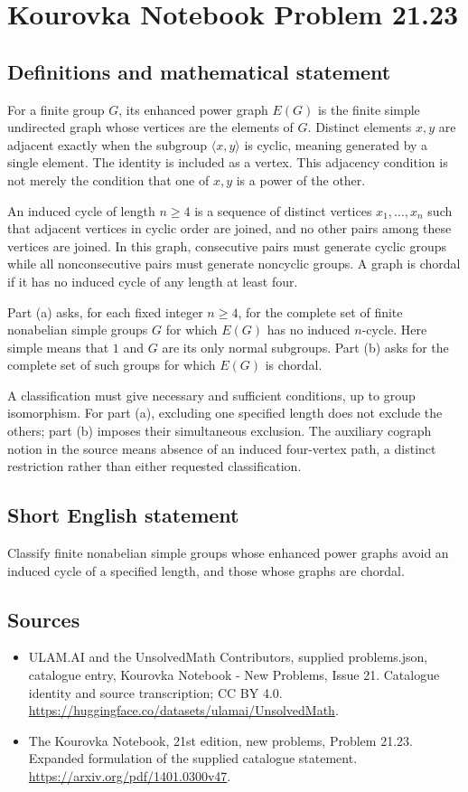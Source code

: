 \documentclass[11pt,a4paper]{article}
\begin{document}
\section*{Kourovka Notebook Problem 21.23}\label{statement}

\subsection{Definitions and mathematical statement}
For a finite group $G$, its enhanced power graph $E(G)$ is the finite
simple undirected graph whose vertices are the elements of $G$.
Distinct elements $x,y$ are adjacent exactly when the subgroup
$\langle x,y\rangle$ is cyclic, meaning generated by a single element.
The identity is included as a vertex. This adjacency condition is not
merely the condition that one of $x,y$ is a power of the other.

An induced cycle of length $n\ge4$ is a sequence of distinct vertices
$x_1,\ldots,x_n$ such that adjacent vertices in cyclic order are joined,
and no other pairs among these vertices are joined. In this graph,
consecutive pairs must generate cyclic groups while all nonconsecutive
pairs must generate noncyclic groups. A graph is chordal if it has no
induced cycle of any length at least four.

Part (a) asks, for each fixed integer $n\ge4$, for the complete set of
finite nonabelian simple groups $G$ for which $E(G)$ has no induced
$n$-cycle. Here simple means that $1$ and $G$ are its only normal
subgroups. Part (b) asks for the complete set of such groups for which
$E(G)$ is chordal.

A classification must give necessary and sufficient conditions, up to
group isomorphism. For part (a), excluding one specified length does
not exclude the others; part (b) imposes their simultaneous exclusion.
The auxiliary cograph notion in the source means absence of an induced
four-vertex path, a distinct restriction rather than either requested
classification.
\subsection{Short English statement}
Classify finite nonabelian simple groups whose enhanced power graphs avoid an induced cycle of a specified length, and those whose graphs are chordal.
\subsection{Sources}
\begin{itemize}
\item[S1] ULAM.AI and the UnsolvedMath Contributors, supplied problems.json, catalogue entry, Kourovka Notebook - New Problems, Issue 21. Catalogue identity and source transcription; CC BY 4.0.
\url{https://huggingface.co/datasets/ulamai/UnsolvedMath}.
\item[S2] The Kourovka Notebook, 21st edition, new problems, Problem 21.23. Expanded formulation of the supplied catalogue statement.
\url{https://arxiv.org/pdf/1401.0300v47}.
\end{itemize}
\end{document}
